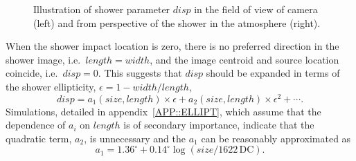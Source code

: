 \begin{figure}[t]
\centerline{}
\caption{\label{FIG::ANALYSIS::2DPARAM} Illustration of 
shower parameter $disp$ in the field of view of camera (left) and from 
perspective of the shower in the atmosphere (right).}
\end{figure}

\enlargethispage{12pt}
When the shower impact location is zero, there is no preferred
direction in the shower image, i.e.\ $length=width$, and the
image centroid and source location coincide, i.e.\ $disp=0$. This
suggests that $disp$ should be expanded in terms of the shower 
ellipticity, $\epsilon=1-width/length$,
\[disp = a_1(size,length)\times \epsilon + a_2(size,length)\times \epsilon^2 + \cdots.\]
Simulations, detailed in appendix~\ref{APP::ELLIPT}, which assume that
the dependence of $a_i$ on $length$ is of secondary importance,
indicate that the quadratic term, $a_2$, is unnecessary and the $a_1$
can be reasonably approximated as
\[a_1 = 1.36^\circ + 0.14^\circ\log(size/1622\,\mathrm{DC}).\]

